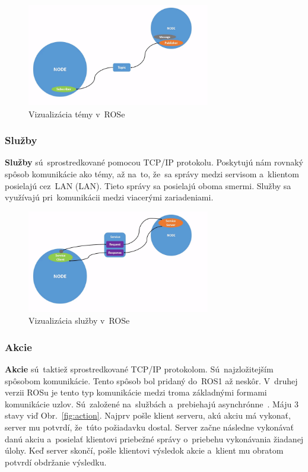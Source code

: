 	\begin{figure}[h]
		\centering
		\includegraphics[width=8cm]{img/topicsExplanation.png}
		\caption{Vizualizácia témy v~ROSe~\cite{RosDoc}}
		\label{fig:topics}
	\end{figure}

\newpage
\subsubsection{Služby}
\label{sec:services}

	\textbf {Služby} sú~sprostredkované pomocou TCP/IP protokolu. Poskytujú nám rovnaký spôsob komunikácie ako témy, až na~to, že~sa správy
	medzi servisom a~klientom posielajú cez~LAN (\acrlong{LAN}). Tieto správy sa posielajú oboma smermi. Služby sa využívajú pri~komunikácii
	medzi viacerými zariadeniami.

	\begin{figure}[h]
		\centering
		\includegraphics[width=8cm]{img/serviceExplanation.png}
		\caption{Vizualizácia služby v~ROSe~\cite{RosDoc}}
		\label{fig:service}
	\end{figure}

\subsubsection{Akcie}
\label{sec:actions}
	\label{s_action}
	\textbf {Akcie} sú~taktiež sprostredkované TCP/IP protokolom. Sú~najzložitejším spôsobom komunikácie. Tento spôsob bol pridaný do~ROS1
	až neskôr. V~druhej verzii ROSu je tento typ komunikácie medzi troma základnými formami komunikácie uzlov. Sú~založené na~službách
	a~prebiehajú asynchrónne~\cite{ROS2book}. Máju 3 stavy viď Obr.~\ref{fig:action}. Najprv pošle klient serveru, akú akciu má vykonať,
	server mu potvrdí, že~túto požiadavku dostal. Server začne následne vykonávať danú akciu a~posielať klientovi priebežné správy o~priebehu
	vykonávania žiadanej úlohy. Keď server skončí, pošle klientovi výsledok akcie a~klient mu obratom potvrdí obdržanie výsledku.

